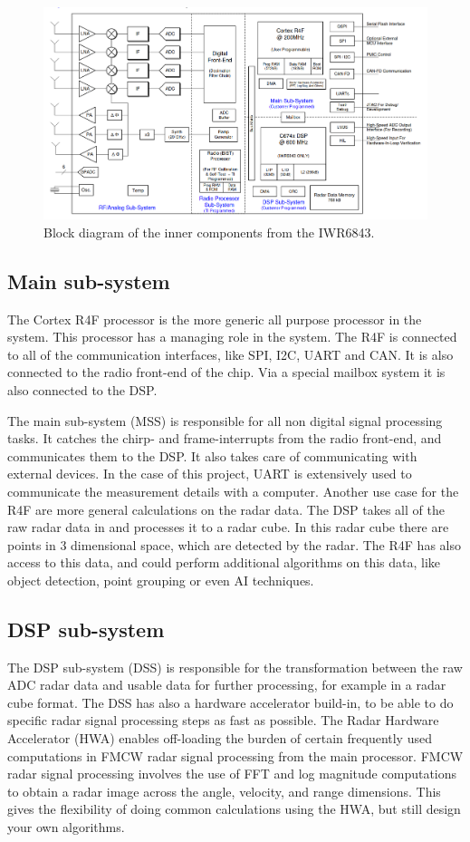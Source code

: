 \begin{figure}[t]
\centering
\includegraphics[width=.95\textwidth]{figures/realtime_implementation/iwr6843_inner.png}
\caption{Block diagram of the inner components from the IWR6843.}
\label{fig:iwr6843_inner_block_diagram}
\end{figure}

\subsection{Main sub-system}
The Cortex R4F processor is the more generic all purpose processor in the system. This processor has a managing role in the system. The R4F is connected to all of the communication interfaces, like SPI, I2C, UART and CAN. It is also connected to the radio front-end of the chip. Via a special mailbox system it is also connected to the DSP. 

The main sub-system (MSS) is responsible for all non digital signal processing tasks. It catches the chirp- and frame-interrupts from the radio front-end, and communicates them to the DSP. It also takes care of communicating with external devices. In the case of this project, UART is extensively used to communicate the measurement details with a computer. Another use case for the R4F are more general calculations on the radar data. The DSP takes all of the raw radar data in and processes it to a radar cube. In this radar cube there are points in 3 dimensional space, which are detected by the radar. The R4F has also access to this data, and could perform additional algorithms on this data, like object detection, point grouping or even AI techniques.

\subsection{DSP sub-system}
The DSP sub-system (DSS) is responsible for the transformation between the raw ADC radar data and usable data for further processing, for example in a radar cube format. The DSS has also a hardware accelerator build-in, to be able to do specific radar signal processing steps as fast as possible. The Radar Hardware Accelerator (HWA) enables off-loading the burden of certain frequently
used computations in FMCW radar signal processing from the main processor. FMCW radar signal processing involves the use of FFT and log magnitude computations to obtain a radar image across the angle, velocity, and range dimensions. This gives the flexibility of doing common calculations using the HWA, but still design your own algorithms.

